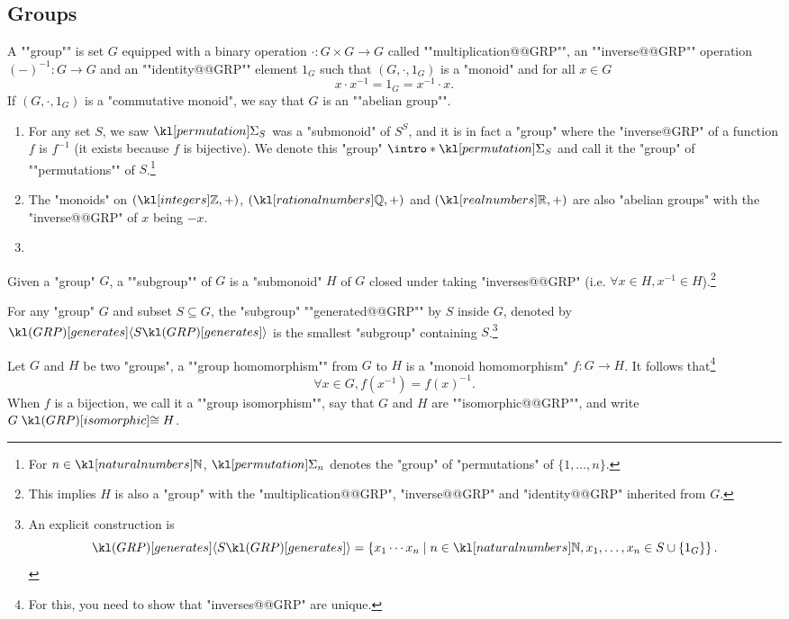 \documentclass[main.tex]{subfiles}
\begin{document}
\subsection{Groups}
\begin{defn}[Group]
    \AP A ""group"" is set $G$ equipped with a binary operation $\cdot: G\times G \rightarrow G$ called ""multiplication@@GRP"", an ""inverse@@GRP"" operation $(-)^{-1} : G \rightarrow G$ and an ""identity@@GRP"" element $1_G$ such that $(G,\cdot, 1_G)$ is a "monoid" and for all $x \in G$
    \[x \cdot x^{-1} = 1_G = x^{-1} \cdot x.\]
    \AP If $(G,\cdot, 1_G)$ is a "commutative monoid", we say that $G$ is an ""abelian group"".
\end{defn}
\begin{exmps}
    \begin{enumerate}
        \item For any set $S$, we saw $\Perm_S$ was a "submonoid" of $S^S$, and it is in fact a "group" where the "inverse@GRP" of a function $f$ is $f^{-1}$ (it exists because $f$ is bijective). \AP We denote this "group" $\intro*\Perm_S$ and call it the "group" of ""permutations"" of $S$.\footnote{For $n \in \N$, $\Perm_n$ denotes the "group" of "permutations" of $\{1,\dots, n\}$.}
        \item The "monoids" on $(\Z,+)$, $(\Q,+)$ and $(\R,+)$ are also "abelian groups" with the "inverse@@GRP" of $x$ being $-x$.
        \item %
    \end{enumerate}
\end{exmps}
\begin{defn}[Subgroup]
    \AP Given a "group" $G$, a ""subgroup"" of $G$ is a "submonoid" $H$ of $G$ closed under taking "inverses@@GRP" (i.e. $\forall x \in H, x^{-1} \in H$).\footnote{This implies $H$ is also a "group" with the "multiplication@@GRP", "inverse@@GRP" and "identity@@GRP" inherited from $G$.}
\end{defn}
\begin{exmp}
	\AP For any "group" $G$ and subset $S \subseteq G$, the "subgroup" ""generated@@GRP"" by $S$ inside $G$, denoted by $\gen{S}$ is the smallest "subgroup" containing $S$.\footnote{An explicit construction is \[\gen{S} = \left\{ x_1\cdots x_n \mid n \in \N, x_1,\dots, x_n \in S\cup \{1_G\} \right\}.\]}
\end{exmp}
\begin{defn}[Homomorphism]
    \AP Let $G$ and $H$ be two "groups", a ""group homomorphism"" from $G$ to $H$ is a "monoid homomorphism" $f: G \rightarrow H$. It follows that\footnote{For this, you need to show that "inverses@@GRP" are unique.} \[\forall x \in G, f(x^{-1}) = f(x)^{-1}.\]
    \AP When $f$ is a bijection, we call it a ""group isomorphism"", say that $G$ and $H$ are ""isomorphic@@GRP"", and write $G \isoGRP H$.
\end{defn}
\end{document}
